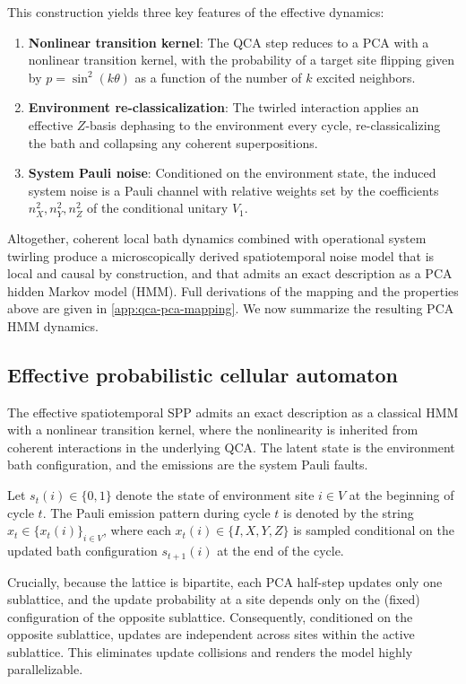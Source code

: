 \documentclass[
    aps,
    prx,
    reprint,
    superscriptaddress,
    longbibliography,
    nofootinbib,
    floatfix,
]{revtex4-2}
\begin{document}
This construction yields three key features of the effective dynamics:
\begin{enumerate}
    \item \textbf{Nonlinear transition kernel}: The QCA step reduces to a PCA with a nonlinear transition kernel, with the probability of a target site flipping given by \(p = \sin^2(k\theta)\) as a function of the number of \(k\) excited neighbors.
    \item \textbf{Environment re-classicalization}: The twirled interaction applies an effective \(Z\)-basis dephasing to the environment every cycle, re-classicalizing the bath and collapsing any coherent superpositions.
    \item \textbf{System Pauli noise}: Conditioned on the environment state, the induced system noise is a Pauli channel with relative weights set by the coefficients \(n_X^2, n_Y^2, n_Z^2\) of the conditional unitary \(V_1\).
\end{enumerate}
Altogether, coherent local bath dynamics combined with operational system twirling produce a microscopically derived spatiotemporal noise model that is local and causal by construction, and that admits an exact description as a PCA hidden Markov model (HMM).
Full derivations of the mapping and the properties above are given in \cref{app:qca-pca-mapping}. We now summarize the resulting PCA HMM dynamics.

\subsection{Effective probabilistic cellular automaton}\label{sec:pca-details}
The effective spatiotemporal SPP admits an exact description as a classical HMM with a nonlinear transition kernel, where the nonlinearity is inherited from coherent interactions in the underlying QCA. The latent state is the environment bath configuration, and the emissions are the system Pauli faults.

Let \(s_{t}(i) \in \{0,1\}\) denote the state of environment site \(i \in V\) at the beginning of cycle \(t\). The Pauli emission pattern during cycle \(t\) is denoted by the string \(x_t \in \{x_t(i)\}_{i \in V}\), where each \(x_t(i) \in \{I, X, Y, Z\}\) is sampled conditional on the updated bath configuration \(s_{t+1}(i)\) at the end of the cycle.

Crucially, because the lattice is bipartite, each PCA half-step updates only one sublattice, and the update probability at a site depends only on the (fixed) configuration of the opposite sublattice. Consequently, conditioned on the opposite sublattice, updates are independent across sites within the active sublattice. This eliminates update collisions and renders the model highly parallelizable.
\end{document}
